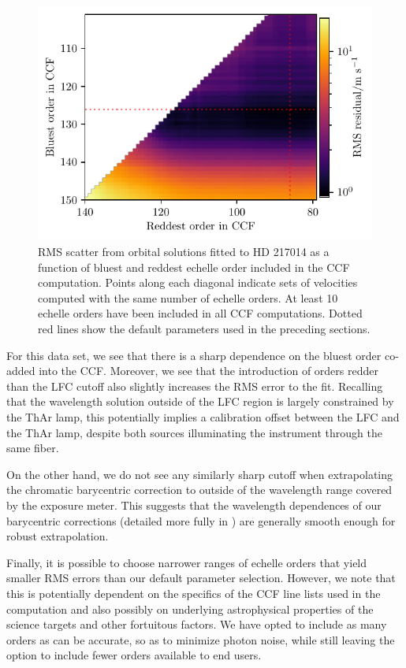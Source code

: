 \begin{figure}
\centering
\includegraphics[width=\textwidth]{figures-4/vel_orders_217014.pdf}
\caption[Cross-correlation order range optimization]{RMS scatter from orbital solutions fitted to HD 217014 as a function of bluest and reddest echelle order included in the CCF computation. Points along each diagonal indicate sets of velocities computed with the same number of echelle orders. At least 10 echelle orders have been included in all CCF computations. Dotted red lines show the default parameters used in the preceding sections.\label{fig:orders}}
\end{figure}

For this data set, we see that there is a sharp dependence on the bluest order co-added into the CCF. Moreover, we see that the introduction of orders redder than the LFC cutoff also slightly increases the RMS error to the fit. Recalling that the wavelength solution outside of the LFC region is largely constrained by the ThAr lamp, this potentially implies a calibration offset between the LFC and the ThAr lamp, despite both sources illuminating the instrument through the same fiber.

On the other hand, we do not see any similarly sharp cutoff when extrapolating the chromatic barycentric correction to outside of the wavelength range covered by the exposure meter. This suggests that the wavelength dependences of our barycentric corrections (detailed more fully in \citealt{blackman_measured_2019}) are generally smooth enough for robust extrapolation.

Finally, it is possible to choose narrower ranges of echelle orders that yield smaller RMS errors than our default parameter selection. However, we note that this is potentially dependent on the specifics of the CCF line lists used in the computation and also possibly on underlying astrophysical properties of the science targets and other fortuitous factors. We have opted to include as many orders as can be accurate, so as to minimize photon noise, while still leaving the option to include fewer orders available to end users.


